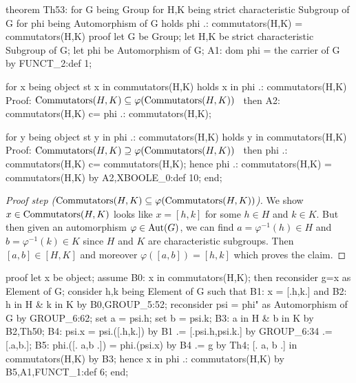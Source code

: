 \nwenddocs{}\endmoddef\nwstartdeflinemarkup{}\nwenddeflinemarkup
theorem Th53:
  for G being Group
  for H,K being strict characteristic Subgroup of G
  for phi being Automorphism of G
  holds phi .: commutators(H,K) = commutators(H,K)
proof
  let G be Group;
  let H,K be strict characteristic Subgroup of G;
  let phi be Automorphism of G;
  A1: dom phi = the carrier of G by FUNCT_2:def 1;

  for x being object st x in commutators(H,K) holds x in phi .: commutators(H,K)
  \LA{}Proof: ${\rm Commutators}(H,K)\subset\varphi({\rm Commutators}(H,K))$~{\nwtagstyle{}}\RA{}
  then A2: commutators(H,K) c= phi .: commutators(H,K);

  for y being object st y in phi .: commutators(H,K) holds y in commutators(H,K)
  \LA{}Proof: ${\rm Commutators}(H,K)\supset\varphi({\rm Commutators}(H,K))$~{\nwtagstyle{}}\RA{}
  then phi .: commutators(H,K) c= commutators(H,K);
  hence phi .: commutators(H,K) = commutators(H,K) by A2,XBOOLE_0:def 10;
end;
\eatline
{}\nwendcode{}\nwdocspar
\begin{proof}[Proof step (${\rm Commutators}(H,K)\subset\varphi({\rm Commutators}(H,K))$)]
We show $x\in{\rm Commutators}(H,K)$ looks like $x=[h,k]$ for some $h\in H$
and $k\in K$. But then given an automorphism $\varphi\in\Aut(G)$, we can
find $a=\varphi^{-1}(h)\in H$ and $b=\varphi^{-1}(k)\in K$ since $H$ and $K$ are
characteristic subgroups. Then $[a,b]\in[H,K]$ and moreover
$\varphi([a,b])=[h,k]$ which proves the claim.
\end{proof}

\nwenddocs{}\endmoddef\nwstartdeflinemarkup{}\nwenddeflinemarkup
proof
  let x be object;
  assume B0: x in commutators(H,K);
  then reconsider g=x as Element of G;
  consider h,k being Element of G such that
  B1: x = [.h,k.] and
  B2: h in H & k in K by B0,GROUP_5:52;
  reconsider psi = phi" as Automorphism of G by GROUP_6:62;
  set a = psi.h;
  set b = psi.k;
  B3: a in H & b in K by B2,Th50;
  B4: psi.x = psi.([.h,k.]) by B1
           .= [.psi.h,psi.k.] by GROUP_6:34
           .= [.a,b.];
  B5: phi.([. a,b .]) = phi.(psi.x) by B4
                     .= g by Th4;
  [. a, b .] in commutators(H,K) by B3;
  hence x in phi .: commutators(H,K) by B5,A1,FUNCT_1:def 6;
end;
\nwendcode{}\nwdocspar

